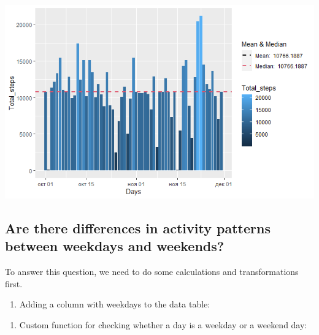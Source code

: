\documentclass[
]{article}
\newenvironment{Shaded}{\begin{snugshade}}{\end{snugshade}}
\newcommand{\ControlFlowTok}[1]{\textcolor[rgb]{0.13,0.29,0.53}{\textbf{#1}}}
\newcommand{\DataTypeTok}[1]{\textcolor[rgb]{0.13,0.29,0.53}{#1}}
\newcommand{\KeywordTok}[1]{\textcolor[rgb]{0.13,0.29,0.53}{\textbf{#1}}}
\newcommand{\NormalTok}[1]{#1}
\newcommand{\OperatorTok}[1]{\textcolor[rgb]{0.81,0.36,0.00}{\textbf{#1}}}
\newcommand{\StringTok}[1]{\textcolor[rgb]{0.31,0.60,0.02}{#1}}
\providecommand{\tightlist}{%
  \setlength{\itemsep}{0pt}\setlength{\parskip}{0pt}}
\begin{document}
\includegraphics[width=1\linewidth]{./Rplot_3}

\hypertarget{are-there-differences-in-activity-patterns-between-weekdays-and-weekends}{%
\subsection{Are there differences in activity patterns between weekdays
and
weekends?}\label{are-there-differences-in-activity-patterns-between-weekdays-and-weekends}}

To answer this question, we need to do some calculations and
transformations first.

\begin{enumerate}
\def\labelenumi{\arabic{enumi}.}
\tightlist
\item
  Adding a column with weekdays to the data table:
\end{enumerate}

\begin{Shaded}
\end{Shaded}

\begin{enumerate}
\def\labelenumi{\arabic{enumi}.}
\setcounter{enumi}{1}
\tightlist
\item
  Custom function for checking whether a day is a weekday or a weekend
  day:
\end{enumerate}

\begin{Shaded}
\end{Shaded}
\end{document}
